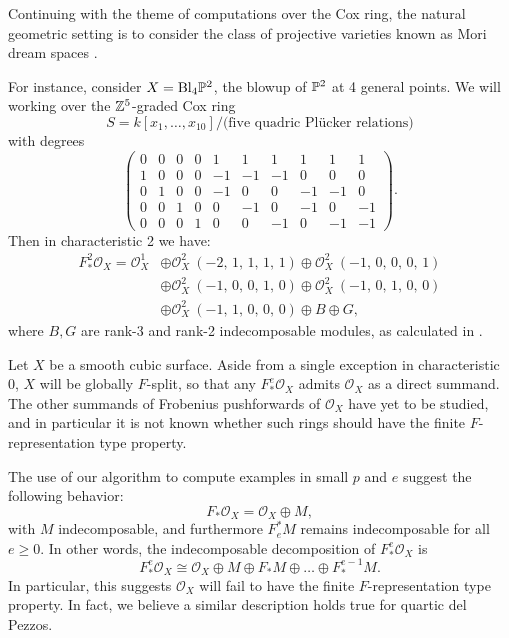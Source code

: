 \documentclass[12pt]{article}
\def\O{\mathcal O}
\numberwithin{equation}{section}
\theoremstyle{theorem}
\numberwithin{thm}{section}
\theoremstyle{definition}
\begin{document}
\begin{exa}
  Continuing with the theme of computations over the Cox ring, the natural geometric setting is to consider the class of projective varieties known as Mori dream spaces \cite{HK00}.

  For instance, consider $X = \mathrm{Bl}_4\P^2$, the blowup of $\P^2$ at 4 general points. We will working over the $\Z^5$-graded Cox ring
  \[ S = k[x_1,\dots,x_{10}]/\text{(five quadric Pl\"ucker relations)} \]
  with degrees
    \[
    \left(\!\begin{array}{rrrrrrrrrr}
      0&0&0&0&1&1&1&1&1&1 \\
      1&0&0&0&-1&-1&-1&0&0&0 \\
      0&1&0&0&-1&0&0&-1&-1&0 \\
      0&0&1&0&0&-1&0&-1&0&-1 \\
      0&0&0&1&0&0&-1&0&-1&-1
    \end{array}\!\right).
    \]
    Then in characteristic 2 we have:
    \begin{align*}
      F_*^2\O_X = {\O_{X}^{1}}
      &\oplus {\O_{X}^{2}\ \left(-2,\,1,\,1,\,1,\,1\right)} \oplus {\O_{X}^{2}\ \left(-1,\,0,\,0,\,0,\,1\right)} \\
      &\oplus {\O_{X}^{2}\ \left(-1,\,0,\,0,\,1,\,0\right)} \oplus {\O_{X}^{2}\ \left(-1,\,0,\,1,\,0,\,0\right)} \\
      &\oplus {\O_{X}^{2}\ \left(-1,\,1,\,0,\,0,\,0\right)} \oplus B \oplus G,
    \end{align*}
    where $B, G$ are rank-3 and rank-2 indecomposable modules, as calculated in \cite{Hara15}.
\end{exa}

\begin{exa}
  Let $X$ be a smooth cubic surface. Aside from a single exception in characteristic 0, $X$ will be globally $F$-split, so that any $F^e_*\O_X $ admits $\O_X$ as a direct summand.
  The other summands of Frobenius pushforwards of $\O_X$ have yet to be studied, and in particular it is not known whether such rings should have the finite $F$-representation type property.

  The use of our algorithm to compute examples in small $p$ and $e$ suggest the following behavior:
  $$ F_* \O_X = \O_X\oplus M, $$
  with $M$ indecomposable, and furthermore $F^*_e M$ remains indecomposable for all $e\geq 0$. In other words, the indecomposable decomposition of $F^e_* \O_X$ is
  $$ F_*^e \O_X \cong \O_X\oplus M\oplus F_* M\oplus\dots\oplus F_*^{e-1}M. $$
  In particular, this suggests $\O_X$ will fail to have the finite $F$-representation type property.
  In fact, we believe a similar description holds true for quartic del Pezzos.
\end{exa}
\end{document}
